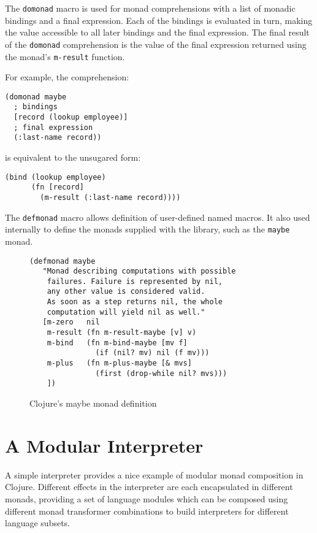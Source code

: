 \documentclass[natbib,10pt]{sigplanconf}
\begin{document}
The {\tt domonad} macro is used for monad comprehensions with a list
of monadic bindings and a final expression.  Each of the bindings is
evaluated in turn, making the value accessible to all later bindings
and the final expression.  The final result of the {\tt domonad}
comprehension is the value of the final expression returned using
the monad's {\tt m-result} function.

For example, the comprehension:
\begin{verbatim}
(domonad maybe
  ; bindings
  [record (lookup employee)]
  ; final expression
  (:last-name record))
\end{verbatim}
is equivalent to the unsugared form:
\begin{verbatim}
(bind (lookup employee)
      (fn [record]
        (m-result (:last-name record))))
\end{verbatim}

The {\tt defmonad} macro allows definition of user-defined named
macros.  It also used internally to define the monads supplied
with the library, such as the {\tt maybe} monad.

\begin{figure}
\begin{center}
\begin{verbatim}
(defmonad maybe
   "Monad describing computations with possible
    failures. Failure is represented by nil,
    any other value is considered valid.
    As soon as a step returns nil, the whole
    computation will yield nil as well."
   [m-zero   nil
    m-result (fn m-result-maybe [v] v)
    m-bind   (fn m-bind-maybe [mv f]
               (if (nil? mv) nil (f mv)))
    m-plus   (fn m-plus-maybe [& mvs]
               (first (drop-while nil? mvs)))
    ])

\end{verbatim}
\end{center}
\caption{Clojure's maybe monad definition}
\label{fig-Clojure-maybe-defn}
\end{figure}

\section{A Modular Interpreter}

A simple interpreter provides a nice example of modular monad
composition in Clojure.  Different effects in the interpreter are each
encapsulated in different monads, providing a set of language modules
which can be composed using different monad transformer combinations
to build interpreters for different language subsets.
\end{document}
